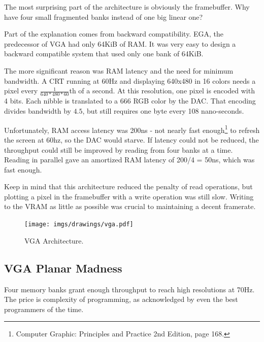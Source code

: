 \documentclass[book.tex]{subfiles}
\begin{document}
The most surprising part of the architecture is obviously the framebuffer. Why have four small fragmented banks instead of one big linear one?\\
\par
Part of the explanation comes from backward compatibility. EGA, the predecessor of VGA had only 64KiB of RAM. It was very easy to design a backward compatible system that used only one bank of 64KiB.\\
\par
The more significant reason was RAM latency and the need for minimum bandwidth. A CRT running at 60Hz and displaying 640x480 in 16 colors needs a pixel every $\frac{1}{640*480*60}$th of a second. At this resolution, one pixel is encoded with 4 bits. Each nibble is translated to a 666 RGB color by the DAC. That encoding divides bandwidth by $4.5$, but still requires one byte every 108 nano-seconds.\\
\par
 Unfortunately, RAM access latency was 200ns - not nearly fast enough\footnote{Computer Graphic: Principles and Practice 2nd Edition, page 168.} to refresh the screen at 60hz, so the DAC would starve. If latency could not be reduced, the throughput could still be improved by reading from four banks at a time. Reading in parallel gave an amortized RAM latency of 200/4 = 50ns, which was fast enough.\\
\par
Keep in mind that this architecture reduced the penalty of read operations, but plotting a pixel in the framebuffer with a write operation was still slow. Writing to the VRAM as little as possible was crucial to maintaining a decent framerate. 


\begin{figure}[H]
\centering
\texttt{[image: imgs/drawings/vga.pdf]}
\caption{VGA Architecture.}
\label{fig:vga_arch}
\end{figure}




\subsection{VGA Planar Madness}

Four memory banks grant enough throughput to reach high resolutions at 70Hz. The price is complexity of programming, as acknowledged by even the best programmers of the time.\\
\end{document}
